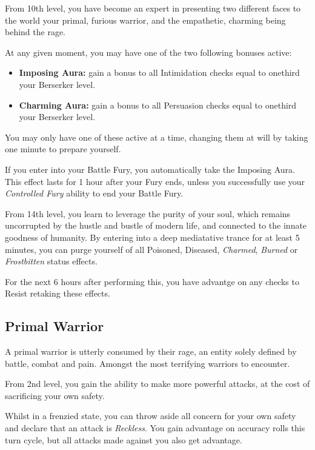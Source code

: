 {
	From 10th level, you have become an expert in presenting two different faces to the world \minus{} your primal, furious warrior, and the empathetic, charming being behind the rage. 

	At any given moment, you may have one of the two following bonuses active:
	\begin{itemize}
		\item {\bf Imposing Aura:} gain a bonus to all Intimidation checks equal to one\minus{}third your Berserker level. 
		\item {\bf Charming Aura:} gain a bonus to all Persuasion checks equal to one\minus{}third your Berserker level. 
	\end{itemize}
	
	You may only have one of these active at a time, changing them at will by taking one minute to prepare yourself. 
	
	If you enter into your Battle Fury, you automatically take the Imposing Aura. This effect lasts for 1 hour after your Fury ends, unless you successfully use your {\it Controlled Fury} ability to end your Battle Fury.   
}

{
	From 14th level, you learn to leverage the purity of your soul, which remains uncorrupted by the hustle and bustle of modern life, and connected to the innate goodness of humanity. By entering into a deep mediatative trance for at least 5 minutes, you can purge yourself of all Poisoned, Diseased, {\it Charmed}, {\it Burned} or {\it Frostbitten} status effects. 
	
	For the next 6 hours after performing this, you have advantge on any checks to Resist retaking these effects. 
}

\subsection*{Primal Warrior}

A primal warrior is utterly consumed by their rage, an entity solely defined by battle, combat and pain. Amongst the most terrifying warriors to encounter. 

{
	From 2nd level, you gain the ability to make more powerful attacks, at the cost of sacrificing your own safety. 

	Whilst in a frenzied state, you can throw aside all concern for your own safety and declare that an attack is {\it Reckless}. You gain advantage on accuracy rolls this turn cycle, but all attacks made against you also get advantage.
}

